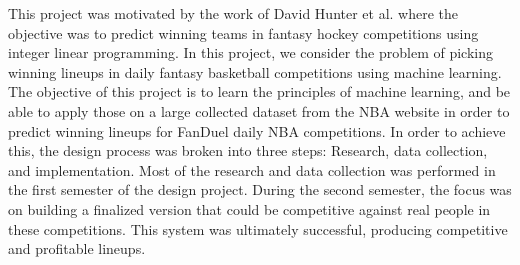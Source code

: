 This project was motivated by the work of David Hunter et al. \cite{picking_winners} where the objective was to predict winning teams in fantasy hockey competitions using integer linear programming. In this project, we consider the problem of picking winning lineups in daily fantasy basketball competitions using machine learning. The objective of this project is to learn the principles of machine learning, and be able to apply those on a large collected dataset from the NBA website in order to predict winning lineups for FanDuel daily NBA competitions. In order to achieve this, the design process was broken into three steps: Research, data collection, and implementation. Most of the research and data collection was performed in the first semester of the design project. During the second semester, the focus was on building a finalized version that could be competitive against real people in these competitions. This system was ultimately successful, producing competitive and profitable lineups.